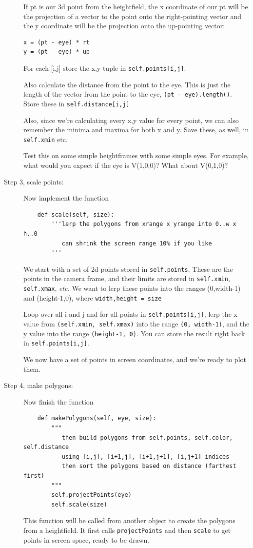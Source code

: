 \documentclass[12pt]{article}
\begin{document}
\begin{description}
If pt is our 3d point from the heightfield,
the x coordinate of our pt will be the projection
of a vector to the point onto the right-pointing vector
and the y coordinate will be the projection onto the up-pointing
vector:
\begin{lstlisting}
x = (pt - eye) * rt
y = (pt - eye) * up
\end{lstlisting}
For each [i,j]
store the x,y tuple in \lstinline{self.points[i,j]}.

Also calculate the distance from the point to the eye.
This is just the length of the vector from the point to the eye,
\lstinline{(pt - eye).length()}.
Store these in \lstinline{self.distance[i,j]}

Also, since we're calculating every x,y value for every point,
we can also remember the minima and maxima for both
x and y.  Save these, as well, in \lstinline{self.xmin} etc.

Test this on some simple heightframes with some simple
eyes.  For example, what would you expect if the eye 
is V(1,0,0)?  What about V(0,1,0)?

\item[Step 3, scale points:]  Now implement the function
\begin{lstlisting}
    def scale(self, size):
        '''lerp the polygons from xrange x yrange into 0..w x h..0
           can shrink the screen range 10% if you like
        '''
\end{lstlisting}
 We start with a set of 2d points
stored in \lstinline{self.points}.  These are the points in the camera
frame, and their limits are stored in \lstinline{self.xmin}, \lstinline{self.xmax},
{\em etc.}  We want to lerp these points into the ranges (0,width-1)
and (height-1,0), where \lstinline{width,height = size}

Loop over all i and j and for all points in \lstinline{self.points[i,j]},
lerp the x value from \lstinline{(self.xmin, self.xmax)}
into the range \lstinline{(0, width-1)}, and the y value
into the range \lstinline{(height-1, 0)}.  You can store
the result right back in \lstinline{self.points[i,j]}.

We now have a set of points in screen coordinates, and we're ready
to plot them.

\item[Step 4, make polygons:] Now finish the function
\begin{lstlisting}
    def makePolygons(self, eye, size):
        """
           then build polygons from self.points, self.color, self.distance
           using [i,j], [i+1,j], [i+1,j+1], [i,j+1] indices
           then sort the polygons based on distance (farthest first)
        """
        self.projectPoints(eye)
        self.scale(size)
\end{lstlisting}
This function will be called from another object to create
the polygons from a heightfield.  It first calls
\lstinline{projectPoints} and then \lstinline{scale}
to get points in screen space, ready to be drawn.


\end{description}
\end{document}
